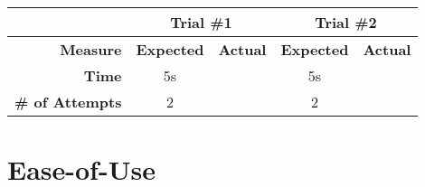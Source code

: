 \documentclass[12pt,letterpaper]{article}
\begin{document}
\begin{center}\begin{tabular}{|r|c|c|c|c|}
\hline
 & \multicolumn{2}{|c|}{Trial \#1} & \multicolumn{2}{|c|}{Trial \#2} \\
\hline
\textbf{Measure} & \textbf{Expected} & \textbf{Actual} & \textbf{Expected} & \textbf{Actual} \\
\hline
\textbf{Time} & 5s & & 5s & \\
\hline
\textbf{\# of Attempts} & 2 & & 2 & \\
\hline
\end{tabular}\end{center}


\section{Ease-of-Use}
\end{document}
